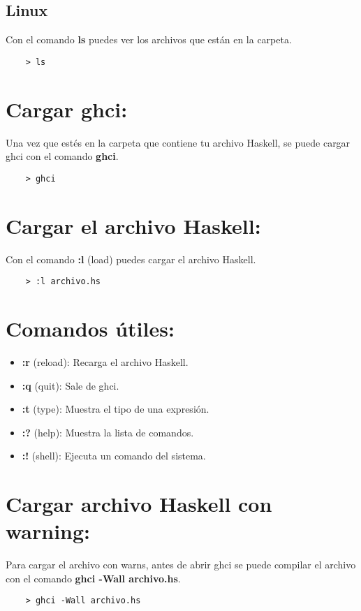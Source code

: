 \documentclass{article}
\begin{document}
\subsection{Linux}
Con el comando \textbf{ls} puedes ver los archivos que están en la carpeta.
\begin{verbatim}
    > ls
\end{verbatim}

\section{Cargar ghci:}
Una vez que estés en la carpeta que contiene tu archivo Haskell, se puede cargar ghci con el comando \textbf{ghci}.
\begin{verbatim}
    > ghci
\end{verbatim}

\section{Cargar el archivo Haskell:}
Con el comando \textbf{:l} (load) puedes cargar el archivo Haskell.
\begin{verbatim}
    > :l archivo.hs
\end{verbatim}

\section{Comandos útiles:}
\begin{itemize}
    \item \textbf{:r} (reload): Recarga el archivo Haskell.
    \item \textbf{:q} (quit): Sale de ghci.
    \item \textbf{:t} (type): Muestra el tipo de una expresión.
    \item \textbf{:?} (help): Muestra la lista de comandos.
    \item \textbf{:!} (shell): Ejecuta un comando del sistema.
\end{itemize}

\section{Cargar archivo Haskell con warning:}
Para cargar el archivo con warns, antes de abrir ghci se puede compilar el archivo con el comando \textbf{ghci -Wall archivo.hs}. 
\begin{verbatim}
    > ghci -Wall archivo.hs
\end{verbatim}
\end{document}
